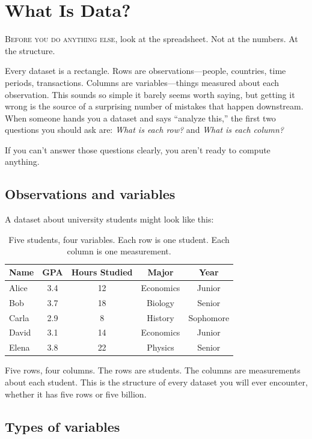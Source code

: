 \chapter{What Is Data?}
\label{ch:data}

\noindent\textsc{Before you do anything else,} look at the spreadsheet. Not at the numbers. At the structure.

Every dataset is a rectangle. Rows are observations---people, countries, time periods, transactions. Columns are variables---things measured about each observation. This sounds so simple it barely seems worth saying, but getting it wrong is the source of a surprising number of mistakes that happen downstream. When someone hands you a dataset and says ``analyze this,'' the first two questions you should ask are: \emph{What is each row?} and \emph{What is each column?}

If you can't answer those questions clearly, you aren't ready to compute anything.

\section{Observations and variables}

A dataset about university students might look like this:

\begin{table}[ht]
\centering
\begin{tabular}{lcccc}
  \toprule
  Name & GPA & Hours Studied & Major & Year \\
  \midrule
  Alice   & 3.4 & 12 & Economics & Junior \\
  Bob     & 3.7 & 18 & Biology   & Senior \\
  Carla   & 2.9 &  8 & History   & Sophomore \\
  David   & 3.1 & 14 & Economics & Junior \\
  Elena   & 3.8 & 22 & Physics   & Senior \\
  \bottomrule
\end{tabular}
\caption{Five students, four variables. Each row is one student. Each column is one measurement.}
\label{tab:student-data}
\end{table}

Five rows, four columns. The rows are students. The columns are measurements about each student. This is the structure of every dataset you will ever encounter, whether it has five rows or five billion.

\section{Types of variables}

